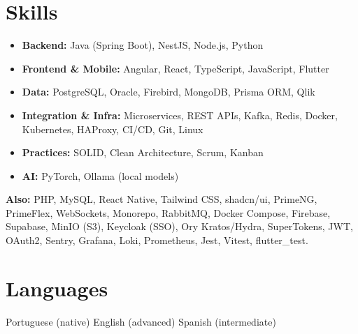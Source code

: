 \section{Skills}
\begin{itemize}
	\item \textbf{Backend:} Java (Spring Boot), NestJS, Node.js, Python
	\item \textbf{Frontend \& Mobile:} Angular, React, TypeScript, JavaScript, Flutter
	\item \textbf{Data:} PostgreSQL, Oracle, Firebird, MongoDB, Prisma ORM, Qlik
	\item \textbf{Integration \& Infra:} Microservices, REST APIs, Kafka, Redis, Docker, Kubernetes, HAProxy, CI/CD, Git, Linux
	\item \textbf{Practices:} SOLID, Clean Architecture, Scrum, Kanban
	\item \textbf{AI:} PyTorch, Ollama (local models)
\end{itemize}
{\small \textbf{Also:} PHP, MySQL, React Native, Tailwind CSS, shadcn/ui, PrimeNG, PrimeFlex, WebSockets, Monorepo, RabbitMQ, Docker Compose, Firebase, Supabase, MinIO (S3), Keycloak (SSO), Ory Kratos/Hydra, SuperTokens, JWT, OAuth2, Sentry, Grafana, Loki, Prometheus, Jest, Vitest, flutter\_test.}

\section{Languages}
Portuguese (native) {\textbullet} English (advanced) {\textbullet} Spanish (intermediate)
